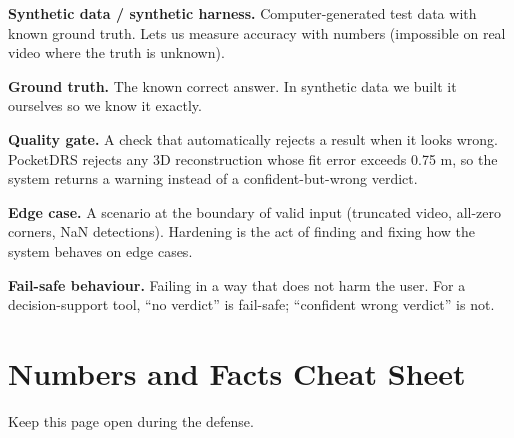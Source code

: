 \documentclass[11pt,a4paper]{article}
\begin{document}
\textbf{Synthetic data / synthetic harness.} Computer-generated test data with known ground truth. Lets us measure accuracy with numbers (impossible on real video where the truth is unknown).

\textbf{Ground truth.} The known correct answer. In synthetic data we built it ourselves so we know it exactly.

\textbf{Quality gate.} A check that automatically rejects a result when it looks wrong. PocketDRS rejects any 3D reconstruction whose fit error exceeds 0.75 m, so the system returns a warning instead of a confident-but-wrong verdict.

\textbf{Edge case.} A scenario at the boundary of valid input (truncated video, all-zero corners, NaN detections). Hardening is the act of finding and fixing how the system behaves on edge cases.

\textbf{Fail-safe behaviour.} Failing in a way that does not harm the user. For a decision-support tool, ``no verdict'' is fail-safe; ``confident wrong verdict'' is not.

\section{Numbers and Facts Cheat Sheet}

Keep this page open during the defense.
\end{document}
